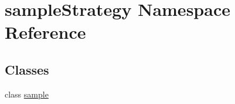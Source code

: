 \hypertarget{namespacesampleStrategy}{
\section{sampleStrategy Namespace Reference}
\label{namespacesampleStrategy}
}
\subsection*{Classes}
\begin{DoxyCompactItemize}
\item 
class \hyperlink{classsampleStrategy_1_1sample}{sample}
\end{DoxyCompactItemize}
